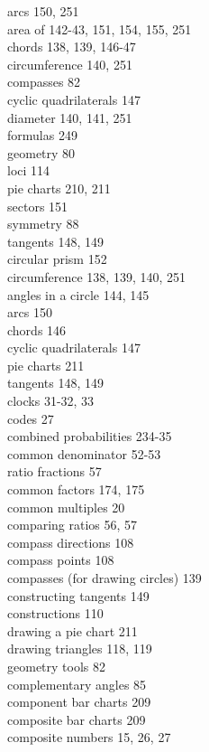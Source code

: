 \documentclass[10pt]{article}
\begin{document}
arcs 150, 251\\
area of 142-43, 151, 154, 155, 251\\
chords 138, 139, 146-47\\
circumference 140, 251\\
compasses 82\\
cyclic quadrilaterals 147\\
diameter 140, 141, 251\\
formulas 249\\
geometry 80\\
loci 114\\
pie charts 210, 211\\
sectors 151\\
symmetry 88\\
tangents 148, 149\\
circular prism 152\\
circumference 138, 139, 140, 251\\
angles in a circle 144, 145\\
arcs 150\\
chords 146\\
cyclic quadrilaterals 147\\
pie charts 211\\
tangents 148, 149\\
clocks 31-32, 33\\
codes 27\\
combined probabilities 234-35\\
common denominator 52-53\\
ratio fractions 57\\
common factors 174, 175\\
common multiples 20\\
comparing ratios 56, 57\\
compass directions 108\\
compass points 108\\
compasses (for drawing circles) 139\\
constructing tangents 149\\
constructions 110\\
drawing a pie chart 211\\
drawing triangles 118, 119\\
geometry tools 82\\
complementary angles 85\\
component bar charts 209\\
composite bar charts 209\\
composite numbers 15, 26, 27\\
\end{document}
